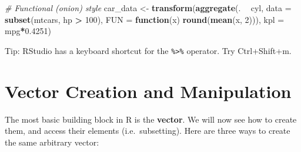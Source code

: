 \documentclass[]{book}
\newenvironment{Shaded}{\begin{snugshade}}{\end{snugshade}}
\newcommand{\KeywordTok}[1]{\textcolor[rgb]{0.13,0.29,0.53}{\textbf{#1}}}
\newcommand{\DataTypeTok}[1]{\textcolor[rgb]{0.13,0.29,0.53}{#1}}
\newcommand{\DecValTok}[1]{\textcolor[rgb]{0.00,0.00,0.81}{#1}}
\newcommand{\FloatTok}[1]{\textcolor[rgb]{0.00,0.00,0.81}{#1}}
\newcommand{\StringTok}[1]{\textcolor[rgb]{0.31,0.60,0.02}{#1}}
\newcommand{\CommentTok}[1]{\textcolor[rgb]{0.56,0.35,0.01}{\textit{#1}}}
\newcommand{\ControlFlowTok}[1]{\textcolor[rgb]{0.13,0.29,0.53}{\textbf{#1}}}
\newcommand{\OperatorTok}[1]{\textcolor[rgb]{0.81,0.36,0.00}{\textbf{#1}}}
\newcommand{\NormalTok}[1]{#1}
\theoremstyle{definition}
\theoremstyle{definition}
\theoremstyle{definition}
\theoremstyle{remark}
\begin{document}
\begin{Shaded}
\begin{Highlighting}[]
\CommentTok{# Functional (onion) style}
\NormalTok{car_data <-}\StringTok{ }
\StringTok{  }\KeywordTok{transform}\NormalTok{(}\KeywordTok{aggregate}\NormalTok{(. }\OperatorTok{~}\StringTok{ }\NormalTok{cyl, }
                      \DataTypeTok{data =} \KeywordTok{subset}\NormalTok{(mtcars, hp }\OperatorTok{>}\StringTok{ }\DecValTok{100}\NormalTok{), }
                      \DataTypeTok{FUN =} \ControlFlowTok{function}\NormalTok{(x) }\KeywordTok{round}\NormalTok{(}\KeywordTok{mean}\NormalTok{(x, }\DecValTok{2}\NormalTok{))), }
            \DataTypeTok{kpl =}\NormalTok{ mpg}\OperatorTok{*}\FloatTok{0.4251}\NormalTok{)}
\end{Highlighting}
\end{Shaded}

\begin{Shaded}
\end{Shaded}

Tip: RStudio has a keyboard shortcut for the \texttt{\%\textgreater{}\%}
operator. Try Ctrl+Shift+m.

\section{Vector Creation and
Manipulation}\label{vector-creation-and-manipulation}

The most basic building block in R is the \textbf{vector}. We will now
see how to create them, and access their elements (i.e.~subsetting).
Here are three ways to create the same arbitrary vector:
\end{document}
